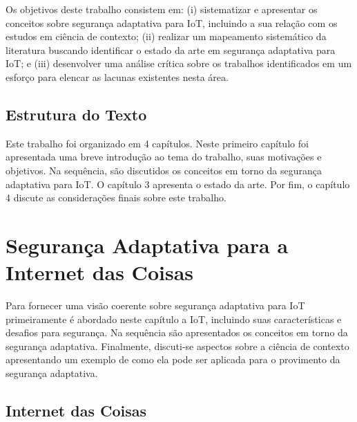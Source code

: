 \documentclass[tid,table]{texufpel} %
\begin{document}
Os objetivos deste trabalho consistem em: (i) sistematizar e apresentar os conceitos sobre segurança adaptativa para IoT, incluindo a sua relação com os estudos em ciência de contexto; (ii) realizar um mapeamento sistemático da literatura buscando identificar o estado da arte em segurança adaptativa para IoT; e (iii) desenvolver uma análise crítica sobre os trabalhos identificados em um esforço para elencar as lacunas existentes nesta área.


\section{Estrutura do Texto}

Este trabalho foi organizado em 4 capítulos. Neste primeiro capítulo foi apresentada uma breve introdução ao tema do trabalho, suas motivações e objetivos. Na sequência, são discutidos os conceitos em torno da segurança adaptativa para IoT. O capítulo 3 apresenta o estado da arte. Por fim, o capítulo 4 discute as considerações finais sobre este trabalho.





\chapter{Segurança Adaptativa para a Internet das Coisas}

Para fornecer uma visão coerente sobre segurança adaptativa para IoT primeiramente é abordado neste capítulo a IoT, incluindo suas características e desafios para segurança. Na sequência são apresentados os conceitos em torno da segurança adaptativa. Finalmente, discuti-se aspectos sobre a ciência de contexto apresentando um exemplo de como ela pode ser aplicada para o provimento da segurança adaptativa.

\section{Internet das Coisas}
\end{document}
